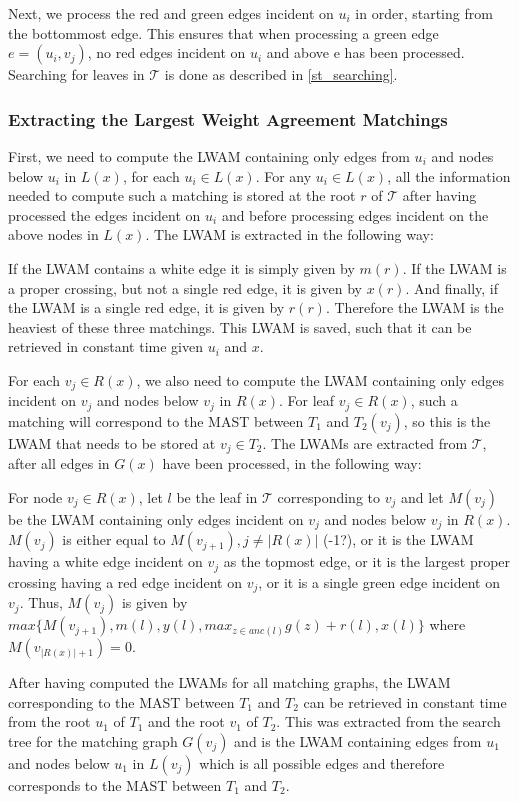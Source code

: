 Next, we process the red and green edges incident on $u_i$ in order, starting from the bottommost edge. This ensures that when processing a green edge $e=(u_i,v_j)$, no red edges incident on $u_i$ and above e has been processed. Searching for leaves in $\mathcal{T}$ is done as described in \ref{st_searching}.

\subsubsection{Extracting the Largest Weight Agreement Matchings}
First, we need to compute the LWAM containing only edges from $u_i$ and nodes below $u_i$ in $L(x)$, for each $u_i \in L(x)$. For any $u_i \in L(x)$, all the information needed to compute such a matching is stored at the root $r$ of $\mathcal{T}$ after having processed the edges incident on $u_i$ and before processing edges incident on the above nodes in $L(x)$. The LWAM is extracted in the following way:

If the LWAM contains a white edge it is simply given by $m(r)$. If the LWAM is a proper crossing, but not a single red edge, it is given by $x(r)$. And finally, if the LWAM is a single red edge, it is given by $r(r)$. Therefore the LWAM is the heaviest of these three matchings. This LWAM is saved, such that it can be retrieved in constant time given $u_i$ and $x$. 

For each $v_j \in R(x)$, we also need to compute the LWAM containing only edges incident on $v_j$ and nodes below $v_j$ in $R(x)$. For leaf $v_j \in R(x)$, such a matching will correspond to the MAST between $T_1$ and $T_2(v_j)$, so this is the LWAM that needs to be stored at $v_j \in T_2$. The LWAMs are extracted from $\mathcal{T}$, after all edges in $G(x)$ have been processed, in the following way:

For node $v_j \in R(x)$, let $l$ be the leaf in $\mathcal{T}$ corresponding to $v_j$ and let $M(v_j)$ be the LWAM containing only edges incident on $v_j$ and nodes below $v_j$ in $R(x)$. $M(v_j)$ is either equal to $M(v_{j+1}), j \ne |R(x)|$ (-1?), or it is the LWAM having a white edge incident on $v_j$ as the topmost edge, or it is the largest proper crossing having a red edge incident on $v_j$, or it is a single green edge incident on $v_j$. Thus, $M(v_j)$ is given by $max\{M(v_{j+1}), m(l), y(l), max_{z \in anc(l)}g(z) + r(l), x(l)\}$ where $M(v_{|R(x)|+1}) = 0$.

After having computed the LWAMs for all matching graphs, the LWAM corresponding to the MAST between $T_1$ and $T_2$ can be retrieved in constant time from the root $u_1$ of $T_1$ and the root $v_1$ of $T_2$. This was extracted from the search tree for the matching graph $G(v_j)$ and is the LWAM containing edges from $u_1$ and nodes below $u_1$ in $L(v_j)$ which is all possible edges and therefore corresponds to the MAST between $T_1$ and $T_2$.

